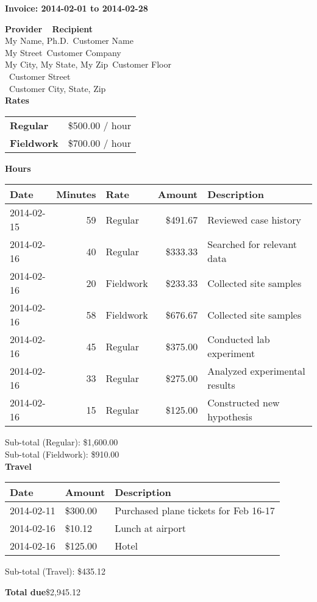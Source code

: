 \documentclass{article}
\begin{document}
\begin{center}{\Large \textbf{Invoice: 2014-02-01 to 2014-02-28}}\end{center}
\textbf{Provider} \mbox{}~\hfill{} \textbf{Recipient} \\
My Name, Ph.D.\mbox{}~\hfill Customer Name \\
My Street\mbox{}~\hfill Customer Company \\
My City, My State, My Zip\mbox{}~\hfill Customer Floor \\
\mbox{}~\hfill Customer Street \\
\mbox{}~\hfill Customer City, State, Zip \\

{\Large\textbf{Rates}}


\begin{tabular}{ll}
\textbf{Regular} & \$500.00 / hour \\
\textbf{Fieldwork} & \$700.00 / hour \\
\end{tabular}

{\Large\textbf{Hours}}


\begin{tabular}{|l|r|l|r|l|}
\hline
\textbf{Date}&\textbf{Minutes}&\textbf{Rate}&\textbf{Amount}&\textbf{Description} \\ \hline
\hline
2014-02-15 & 59 & Regular & \$491.67 & Reviewed case history\\
\hline
2014-02-16 & 40 & Regular & \$333.33 & Searched for relevant data\\
\hline
2014-02-16 & 20 & Fieldwork & \$233.33 & Collected site samples\\
\hline
2014-02-16 & 58 & Fieldwork & \$676.67 & Collected site samples\\
\hline
2014-02-16 & 45 & Regular & \$375.00 & Conducted lab experiment\\
\hline
2014-02-16 & 33 & Regular & \$275.00 & Analyzed experimental results\\
\hline
2014-02-16 & 15 & Regular & \$125.00 & Constructed new hypothesis\\
\hline
\end{tabular}


Sub-total (Regular): \$1,600.00 \\Sub-total (Fieldwork): \$910.00 \\


{\Large\textbf{Travel}}


\begin{tabular}{|l|l|l|}
\hline
\textbf{Date}&\textbf{Amount}&\textbf{Description}\\ \hline
\hline 2014-02-11 & \$300.00 & Purchased plane tickets for Feb 16-17 \\
\hline 2014-02-16 & \$10.12 & Lunch at airport \\
\hline 2014-02-16 & \$125.00 & Hotel \\
\hline
\end{tabular}


Sub-total (Travel): \$435.12

{\Large\textbf{Total due}\hfill\$2,945.12}
\end{document}
